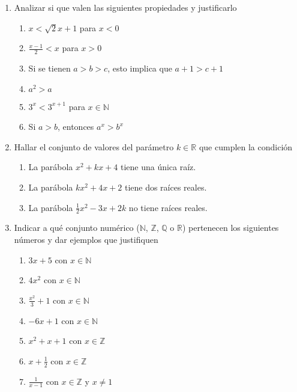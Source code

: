 \documentclass[a4paper]{article}
\newcommand{\exercise}{\item}
\begin{document}
\begin{enumerate}
\begin{enumerate} [label=(\alph*)]
		\item $-8(x-2)(2x+7)<0$
	\end{enumerate}
	\exercise Analizar si que valen las siguientes propiedades y justificarlo
	\begin{multicols}{2}
	\begin{enumerate} [label=(\alph*)]
		\item $x < \sqrt{2} x +1$ para $x<0$
		\item $\displaystyle\frac{x-1}{2} < x$ para $x>0$
		\item Si se tienen $a>b>c$, esto implica que $a+1>c+1$
		\item $a^2 > a$
		\item $3^{x} < 3^{x+1}$ para $x \in \mathbb{N}$
		\item Si $a>b$, entonces $a^x > b^x$
	\end{enumerate}
	\end{multicols}
	\exercise Hallar el conjunto de valores del parámetro $k \in \mathbb{R}$ que cumplen la condición
	\begin{enumerate} [label=(\alph*)]
		\item La parábola $x^2+kx+4$ tiene una única raíz.
		\item La parábola $kx^2+4x+2$ tiene dos raíces reales.
		\item La parábola $\displaystyle\frac{1}{2}x^2-3x+2k$ no tiene raíces reales.
	\end{enumerate}
	\exercise Indicar a qué conjunto numérico ($\mathbb{N}$, $\mathbb{Z}$, $\mathbb{Q}$ o $\mathbb{R}$) pertenecen los siguientes números y dar ejemplos que justifiquen
	\begin{multicols}{2}
	\begin{enumerate} [label=(\alph*)]
		\item $3x+5$ con $x \in \mathbb{N}$
		\item $4x^2$ con $x \in \mathbb{N}$
		\item $\displaystyle\frac{x^2}{3}+1$ con $x \in \mathbb{N}$
		\item $-6x+1$ con $x \in \mathbb{N}$
		\item $x^2+x+1$ con $x \in \mathbb{Z}$
		\item $x+\displaystyle\frac{1}{2}$ con $x \in \mathbb{Z}$
		\item $\displaystyle\frac{1}{x-1}$ con $x \in \mathbb{Z}$ y $x \neq 1$

\end{enumerate}
\end{multicols}
\end{enumerate}
\end{document}
